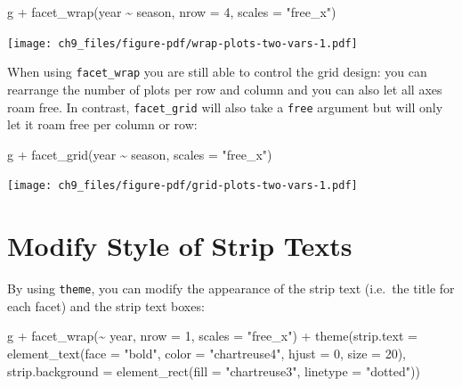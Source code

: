 \documentclass[
  letterpaper,
]{scrbook}
\newenvironment{Shaded}{\begin{snugshade}}{\end{snugshade}}
\newcommand{\AttributeTok}[1]{\textcolor[rgb]{0.40,0.45,0.13}{#1}}
\newcommand{\DecValTok}[1]{\textcolor[rgb]{0.68,0.00,0.00}{#1}}
\newcommand{\FunctionTok}[1]{\textcolor[rgb]{0.28,0.35,0.67}{#1}}
\newcommand{\NormalTok}[1]{\textcolor[rgb]{0.00,0.23,0.31}{#1}}
\newcommand{\SpecialCharTok}[1]{\textcolor[rgb]{0.37,0.37,0.37}{#1}}
\newcommand{\StringTok}[1]{\textcolor[rgb]{0.13,0.47,0.30}{#1}}
\begin{document}
\begin{Shaded}
\begin{Highlighting}[]
\NormalTok{g }\SpecialCharTok{+} \FunctionTok{facet\_wrap}\NormalTok{(year }\SpecialCharTok{\textasciitilde{}}\NormalTok{ season, }\AttributeTok{nrow =} \DecValTok{4}\NormalTok{, }\AttributeTok{scales =} \StringTok{"free\_x"}\NormalTok{)}
\end{Highlighting}
\end{Shaded}

\texttt{[image: ch9\_files/figure-pdf/wrap-plots-two-vars-1.pdf]}

When using \texttt{facet\_wrap} you are still able to control the grid
design: you can rearrange the number of plots per row and column and you
can also let all axes roam free. In contrast, \texttt{facet\_grid} will
also take a \texttt{free} argument but will only let it roam free per
column or row:

\begin{Shaded}
\begin{Highlighting}[]
\NormalTok{g }\SpecialCharTok{+} \FunctionTok{facet\_grid}\NormalTok{(year }\SpecialCharTok{\textasciitilde{}}\NormalTok{ season, }\AttributeTok{scales =} \StringTok{"free\_x"}\NormalTok{)}
\end{Highlighting}
\end{Shaded}

\texttt{[image: ch9\_files/figure-pdf/grid-plots-two-vars-1.pdf]}

\section{Modify Style of Strip Texts}\label{modify-style-of-strip-texts}

By using \texttt{theme}, you can modify the appearance of the strip text
(i.e.~the title for each facet) and the strip text boxes:

\begin{Shaded}
\begin{Highlighting}[]
\NormalTok{g }\SpecialCharTok{+} \FunctionTok{facet\_wrap}\NormalTok{(}\SpecialCharTok{\textasciitilde{}}\NormalTok{ year, }\AttributeTok{nrow =} \DecValTok{1}\NormalTok{, }\AttributeTok{scales =} \StringTok{"free\_x"}\NormalTok{) }\SpecialCharTok{+}
  \FunctionTok{theme}\NormalTok{(}\AttributeTok{strip.text =} \FunctionTok{element\_text}\NormalTok{(}\AttributeTok{face =} \StringTok{"bold"}\NormalTok{, }\AttributeTok{color =} \StringTok{"chartreuse4"}\NormalTok{,}
                                  \AttributeTok{hjust =} \DecValTok{0}\NormalTok{, }\AttributeTok{size =} \DecValTok{20}\NormalTok{),}
        \AttributeTok{strip.background =} \FunctionTok{element\_rect}\NormalTok{(}\AttributeTok{fill =} \StringTok{"chartreuse3"}\NormalTok{, }\AttributeTok{linetype =} \StringTok{"dotted"}\NormalTok{))}
\end{Highlighting}
\end{Shaded}
\end{document}
